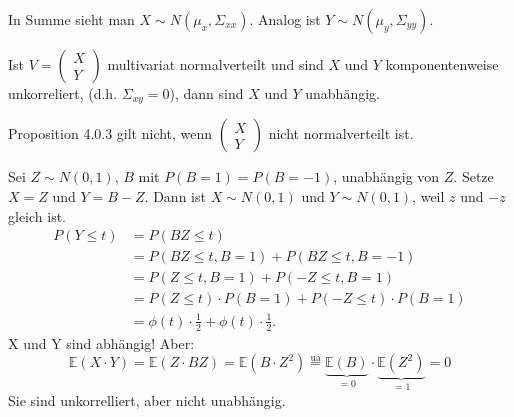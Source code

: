 \documentclass[10pt]{article}
\newcommand{\EW}{\mathbb{E}} %
\newcommand{\halb}{\frac{1}{2}} %
\newenvironment{BSP}[1][]
{\begin{Beispiel}[frametitle=#1]}{\end{Beispiel}}
\begin{document}
			In Summe sieht man $X \sim N(\mu_x, \Sigma_{xx})$. Analog ist $Y \sim N(\mu_y, \Sigma_{yy})$.
			\begin{Proposition}
				Ist $V = \left(
				\begin{array}{c}
					X\\
					Y
				\end{array}
				\right)$ multivariat normalverteilt und sind $X$ und $Y$ komponentenweise unkorreliert, (d.h. $\Sigma_{xy} = 0$), dann sind $X$ und $Y$ unabhängig. 
			\end{Proposition}
			\begin{Bemerkung}
				Proposition 4.0.3 gilt nicht, wenn $\left(
				\begin{array}{c}
					X\\
					Y
				\end{array}
				\right)$ nicht normalverteilt ist. 
			\end{Bemerkung}
			\begin{BSP}[Beispiel 4.0.1 (Unabhängigkeit)]
				Sei $Z \sim N(0,1)$, $B$ mit $P(B=1) = P(B=-1)$, unabhängig von $Z$. Setze $X=Z$ und $Y=B-Z$. Dann ist $X \sim N(0,1)$ und $Y \sim N(0,1)$, weil $z$ und $-z$ gleich ist.
				\begin{equation*}
					\begin{split}
						P (Y \leq t) &= P(BZ \leq t)\\
						&= P(BZ \leq t, B = 1) + P(BZ \leq t, B = -1)\\
						&= P(Z \leq t, B=1) + P(-Z \leq t, B = 1)\\
						&= P(Z \leq t) \cdot P(B=1) + P(-Z \leq t) \cdot P(B =1)\\
						&= \phi(t) \cdot \halb + \phi(t) \cdot \halb.
					\end{split}
				\end{equation*}
				X und Y sind abhängig!
				Aber: \begin{equation*}
					\EW(X \cdot Y) = \EW (Z\cdot BZ) = \EW(B \cdot Z^2) \overset{\text{ua}}{=} \underbrace{\EW(B)}_{=0} \cdot \underbrace{\EW(Z^2)}_{=1} = 0
				\end{equation*}
				Sie sind unkorrelliert, aber nicht unabhängig. 
			\end{BSP}
\end{document}
